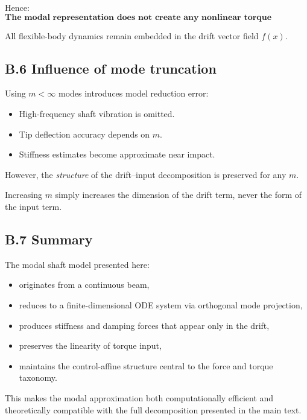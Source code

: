 \documentclass[12pt]{article}
\begin{document}
Hence:
\[
  \textbf{The modal representation does not create any nonlinear torque dependence.}
\]

All flexible-body dynamics remain embedded in the drift vector field \(f(x)\).

\subsection{B.6 \quad Influence of mode truncation}

Using \(m < \infty\) modes introduces model reduction error:
\begin{itemize}
  \item High-frequency shaft vibration is omitted.
  \item Tip deflection accuracy depends on \(m\).
  \item Stiffness estimates become approximate near impact.
\end{itemize}

However, the \emph{structure} of the drift--input decomposition is preserved for any \(m\).

Increasing \(m\) simply increases the dimension of the drift term, never the form of the input term.

\subsection{B.7 \quad Summary}

The modal shaft model presented here:
\begin{itemize}
  \item originates from a continuous beam,
  \item reduces to a finite-dimensional ODE system via orthogonal mode projection,
  \item produces stiffness and damping forces that appear only in the drift,
  \item preserves the linearity of torque input,
  \item maintains the control-affine structure central to the force and torque taxonomy.
\end{itemize}

This makes the modal approximation both computationally efficient and theoretically compatible with the full decomposition presented in the main text.
\end{document}

